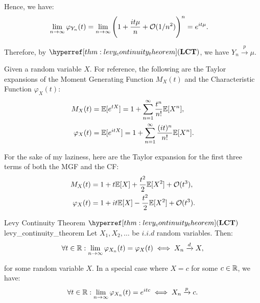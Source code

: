 \begin{proof*}
\begin{enumerate}
        \noindent Hence, we have:
        \begin{align*}
            \lim_{n\to\infty}\varphi_{Y_n}(t) &= \lim_{n\to\infty}\Bigg( 
                1 + \frac{it\mu}{n} + \mathcal{O}(1/n^2)
             \Bigg)^n = e^{it\mu}.
        \end{align*}

        \noindent Therefore, by $\LCT$, we have $Y_n\xrightarrow{p} \mu$.
    \end{enumerate}

    \begin{remark}
        Given a random variable $X$. For reference, the following are the Taylor expansions of the Moment Generating Function $M_X(t)$ and the Characteristic Function $\varphi_X(t)$:
        \begin{equation}
            \begin{aligned}
                M_X(t) &= \mathbb{E}[e^{tX}] = 1 + \sum_{n=1}^\infty \frac{t^n}{n!}\mathbb{E}[X^n], \\
                \varphi_X(t) &= \mathbb{E}[e^{itX}] = 1 + \sum_{n=1}^\infty \frac{(it)^n}{n!}\mathbb{E}[X^n].
            \end{aligned}
        \end{equation}

        For the sake of my laziness, here are the Taylor expansion for the first three terms of both the MGF and the CF:
        \begin{equation}
            \begin{aligned}
                M_X(t) &= 1 + t\mathbb{E}[X] + \frac{t^2}{2}\mathbb{E}[X^2] + \mathcal{O}(t^3), \\
                \varphi_X(t) &= 1 + it\mathbb{E}[X] - \frac{t^2}{2}\mathbb{E}[X^2] + \mathcal{O}(t^3).
            \end{aligned}
        \end{equation}
    \end{remark}
\end{proof*}

\begin{theorem}{Levy Continuity Theorem $\LCT$}{levy_continuity_theorem}
    Let $X_1, X_2, \dots$ be $i.i.d$ random variables. Then:
    \begin{equation}
        \forall t \in \mathbb{R}: \lim_{n\to\infty}\varphi_{X_n}(t) = \varphi_X(t) \iff X_n \xrightarrow{d} X,
    \end{equation}

    \noindent for some random variable $X$. In a special case where $X = c$ for some $c\in \mathbb{R}$, we have:
    \begin{equation}
        \forall t \in \mathbb{R} : \lim_{n\to\infty} \varphi_{X_n}(t) = e^{itc} \iff X_n \xrightarrow{p} c.
    \end{equation}
\end{theorem}


